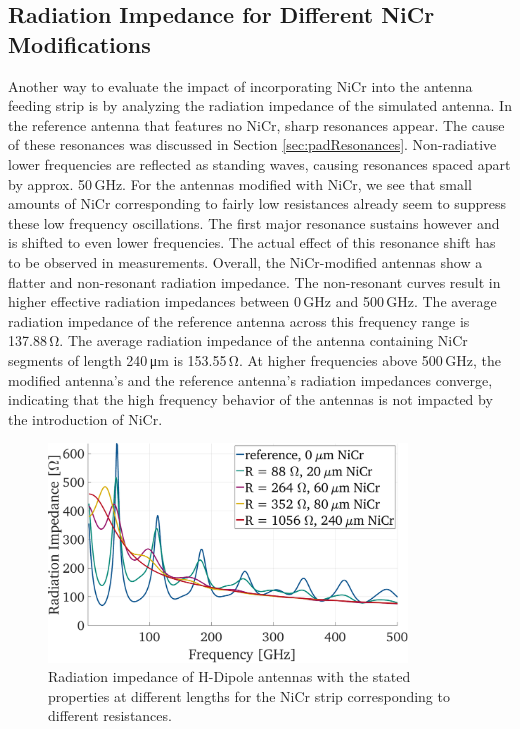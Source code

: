 \subsection{Radiation Impedance for Different NiCr Modifications}

Another way to evaluate the impact of incorporating NiCr into the antenna feeding strip is by analyzing the radiation impedance of the simulated antenna. In the reference antenna that features no NiCr, sharp resonances appear. The cause of these resonances was discussed in Section \ref{sec:padResonances}. Non-radiative lower frequencies are reflected as standing waves, causing resonances spaced apart by approx. \num{50}\,\si{\giga \hertz}. For the antennas modified with NiCr, we see that small amounts of NiCr corresponding to fairly low resistances already seem to suppress these low frequency oscillations. The first major resonance sustains however and is shifted to even lower frequencies. The actual effect of this resonance shift has to be observed in measurements. Overall, the NiCr-modified antennas show a flatter and non-resonant radiation impedance. The non-resonant curves result in higher effective radiation impedances between \num{0}\,\si{\giga \hertz} and \num{500}\,\si{\giga \hertz}. The average radiation impedance of the reference antenna across this frequency range is \num{137.88}\,\si{\ohm}. The average radiation impedance of the antenna containing NiCr segments of length \num{240}\,\si{\micro \meter} is \num{153.55}\,\si{\ohm}. 
At higher frequencies above \num{500}\,\si{\giga \hertz}, the modified antenna's and the reference antenna's radiation impedances converge, indicating that the high frequency behavior of the antennas is not impacted by the introduction of NiCr. 


\begin{figure}[!]
    \centering
    \includegraphics[width=0.85\textwidth]{figures/appdx/sim_rad_imp_H_Dipoles.pdf}
    \caption{Radiation impedance of H-Dipole antennas with the stated properties at different lengths for the NiCr strip corresponding to different resistances.}
    \label{}
\end{figure}

